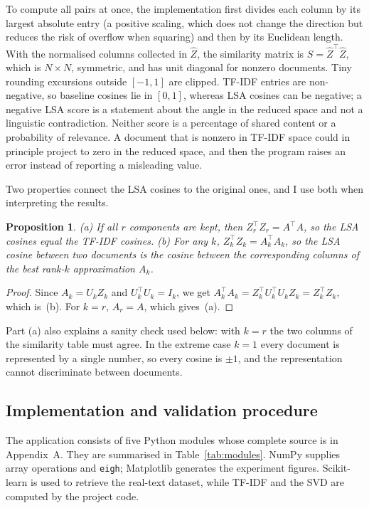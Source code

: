 \documentclass[12pt,a4paper]{report}
\newcommand{\T}{^{\top}}
\theoremstyle{plain}
\newtheorem{proposition}[theorem]{Proposition}
\theoremstyle{definition}
\theoremstyle{remark}
\theoremstyle{definition}
\begin{document}
To compute all pairs at once, the implementation first divides each column by its largest absolute entry (a positive scaling, which does not change the direction but reduces the risk of overflow when squaring) and then by its Euclidean length. With the normalised columns collected in $\widehat Z$, the similarity matrix is $S=\widehat Z\T\widehat Z$, which is $N\times N$, symmetric, and has unit diagonal for nonzero documents. Tiny rounding excursions outside $[-1,1]$ are clipped. TF-IDF entries are non-negative, so baseline cosines lie in $[0,1]$, whereas LSA cosines can be negative; a negative LSA score is a statement about the angle in the reduced space and not a linguistic contradiction. Neither score is a percentage of shared content or a probability of relevance. A document that is nonzero in TF-IDF space could in principle project to zero in the reduced space, and then the program raises an error instead of reporting a misleading value.

Two properties connect the LSA cosines to the original ones, and I use both when interpreting the results.

\begin{proposition}\label{prop:cos}
(a) If all $r$ components are kept, then $Z_r\T Z_r=A\T A$, so the LSA cosines equal the TF-IDF cosines. (b) For any $k$, $Z_k\T Z_k=A_k\T A_k$, so the LSA cosine between two documents is the cosine between the corresponding columns of the best rank-$k$ approximation $A_k$.
\end{proposition}

\begin{proof}
Since $A_k=U_kZ_k$ and $U_k\T U_k=I_k$, we get $A_k\T A_k=Z_k\T U_k\T U_kZ_k=Z_k\T Z_k$, which is~(b). For $k=r$, $A_r=A$, which gives~(a).
\end{proof}

Part (a) also explains a sanity check used below: with $k=r$ the two columns of the similarity table must agree. In the extreme case $k=1$ every document is represented by a single number, so every cosine is $\pm1$, and the representation cannot discriminate between documents.

\subsection{Implementation and validation procedure}

The application consists of five Python modules whose complete source is in Appendix~A. They are summarised in Table~\ref{tab:modules}. NumPy supplies array operations and \texttt{eigh}; Matplotlib generates the experiment figures. Scikit-learn is used to retrieve the real-text dataset, while TF-IDF and the SVD are computed by the project code.
\end{document}

